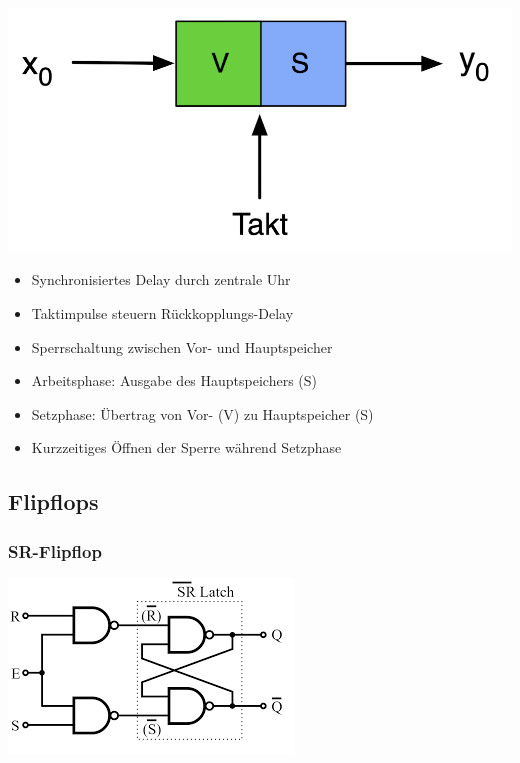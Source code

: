 \documentclass[a4paper,6pt]{article}
\begin{document}
\begin{multicols*}{3}
\begin{center}
    \includegraphics[width=0.5\linewidth]{resources/Bildschirmfoto 2024-01-04 um 10.25.00.png}
\end{center}

\begin{itemize}
    \item Synchronisiertes Delay durch zentrale Uhr
    \item Taktimpulse steuern Rückkopplungs-Delay
    \item Sperrschaltung zwischen Vor- und Hauptspeicher
    \item Arbeitsphase: Ausgabe des Hauptspeichers (S)
    \item Setzphase: Übertrag von Vor- (V) zu Hauptspeicher (S)
    \item Kurzzeitiges Öffnen der Sperre während Setzphase
\end{itemize}

\subsection{Flipflops}

\subsubsection{SR-Flipflop}

\begin{center}
    \includegraphics[width=0.75\linewidth]{resources/SR_FlipFlop_CLK.png}
\end{center}


\end{multicols*}
\end{document}
